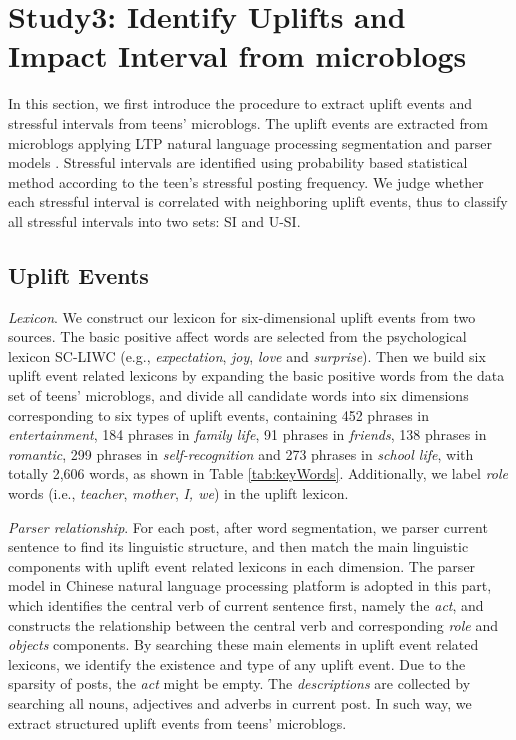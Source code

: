 \section{Study3: Identify Uplifts and Impact Interval from microblogs}
In this section,
we first introduce the procedure to extract uplift events and stressful intervals from teens' microblogs.
The uplift events are extracted from microblogs applying LTP natural language processing segmentation and parser models
\cite{che2008}.
Stressful intervals are identified using probability based statistical method according to the teen's stressful posting frequency.
We judge whether each stressful interval is correlated with neighboring uplift events,
thus to classify all stressful intervals into two sets: SI and U-SI.

\subsection{Uplift Events}
\emph{Lexicon}.
We construct our lexicon for six-dimensional uplift events from two sources.
The basic positive affect words are selected from the psychological lexicon SC-LIWC (e.g., \emph{expectation}, \emph{joy}, \emph{love} and \emph{surprise})\cite{Tausczik2010The}.
Then we build six uplift event related lexicons by expanding the basic positive words from the data set of teens' microblogs,
and divide all candidate words into six dimensions corresponding to six types of uplift events,
containing 452 phrases in \emph{entertainment},
184 phrases in \emph{family life},
91 phrases in \emph{friends},
138 phrases in \emph{romantic},
299 phrases in \emph{self-recognition} and 273 phrases in \emph{school life}, with totally 2,606 words,
as shown in Table \ref{tab:keyWords}.
Additionally, we label \emph{role} words (i.e., \emph{teacher}, \emph{mother}, \emph{I, we}) in the uplift lexicon.

\emph{Parser relationship}.
For each post, after word segmentation, we parser current sentence to find its linguistic structure,
and then match the main linguistic components with uplift event related lexicons in each dimension.
The parser model in Chinese natural language processing platform \cite{Che2010, che2008} is adopted in this part,
which identifies the central verb of current sentence first, namely the \emph{act},
and constructs the relationship between the central verb and corresponding \emph{role} and \emph{objects} components.
By searching these main elements in uplift event related lexicons,
we identify the existence and type of any uplift event.
Due to the sparsity of posts, the \emph{act} might be empty.
The \emph{descriptions} are collected by searching all nouns, adjectives and adverbs in current post.
In such way, we extract structured uplift events from teens' microblogs.

